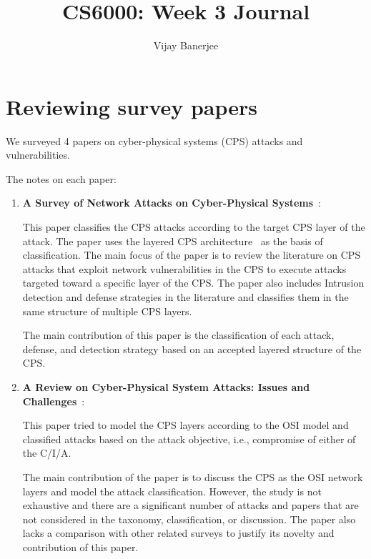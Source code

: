 \documentclass[12pt]{article}
\begin{document}
 
\makeatletter
\title{CS6000: Week 3 Journal}
\author{Vijay Banerjee}
\maketitle



\section*{Reviewing survey papers}

We surveyed 4 papers on cyber-physical systems (CPS) attacks and vulnerabilities.

The notes on each paper:

\begin{enumerate}
    \item 
    \textbf{A Survey of Network Attacks on
Cyber-Physical Systems}~\cite{9019636}:

This paper classifies the CPS attacks according to the target CPS layer of the attack. The paper uses the layered CPS architecture~\cite{lu2013new} as the basis of classification. The main focus of the paper is to review the literature on CPS attacks that exploit network vulnerabilities in the CPS to execute attacks targeted toward a specific layer of the CPS. The paper also includes Intrusion detection and defense strategies in the literature and classifies them in the same structure of multiple CPS layers.

The main contribution of this paper is the classification of each attack, defense, and detection strategy based on an accepted layered structure of the CPS.

\item 
\textbf{A Review on Cyber-Physical System Attacks:
Issues and Challenges}~\cite{singh2020review}:

This paper tried to model the CPS layers according to the OSI model and classified attacks based on the attack objective, i.e., compromise of either of the C/I/A.

The main contribution of the paper is to discuss the CPS as the OSI network layers and model the attack classification. However, the study is not exhaustive and there are a significant number of attacks and papers that are not considered in the taxonomy, classification, or discussion. The paper also lacks a comparison with other related surveys to justify its novelty and contribution of this paper.


\end{enumerate}
\end{document}

